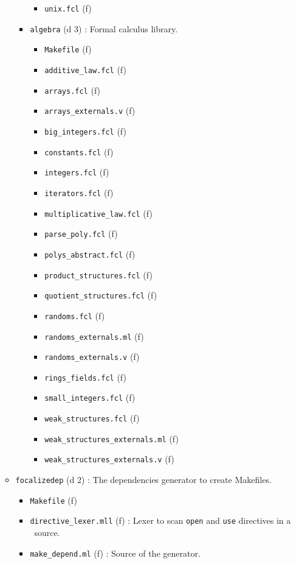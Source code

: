 \begin{itemize}
\begin{itemize}
\begin{itemize}
\begin{itemize}
      \item{\tt unix.fcl} (f)
      \end{itemize}
    \item {\tt algebra} (d 3) : Formal calculus library.
      \begin{itemize}
      \item {\tt Makefile} (f)
      \item {\tt additive\_law.fcl} (f)
      \item {\tt arrays.fcl} (f)
      \item {\tt arrays\_externals.v} (f)
      \item {\tt big\_integers.fcl} (f)
      \item {\tt constants.fcl} (f)
      \item {\tt integers.fcl} (f)
      \item {\tt iterators.fcl} (f)
      \item {\tt multiplicative\_law.fcl} (f)
      \item {\tt parse\_poly.fcl} (f)
      \item {\tt polys\_abstract.fcl} (f)
      \item {\tt product\_structures.fcl} (f)
      \item {\tt quotient\_structures.fcl} (f)
      \item {\tt randoms.fcl} (f)
      \item {\tt randoms\_externals.ml} (f)
      \item {\tt randoms\_externals.v} (f)
      \item {\tt rings\_fields.fcl} (f)
      \item {\tt small\_integers.fcl} (f)
      \item {\tt weak\_structures.fcl} (f)
      \item {\tt weak\_structures\_externals.ml} (f)
      \item {\tt weak\_structures\_externals.v} (f)
      \end{itemize}
    \end{itemize}
  \item {\tt focalizedep} (d 2) : The dependencies generator to create
    Makefiles.
    \begin{itemize}
    \item {\tt Makefile} (f)
    \item {\tt directive\_lexer.mll} (f) : Lexer to scan {\tt open}
      and {\tt use} directives in a \focalize\ source.
    \item {\tt make\_depend.ml} (f) : Source of the generator.

\end{itemize}
\end{itemize}
\end{itemize}

